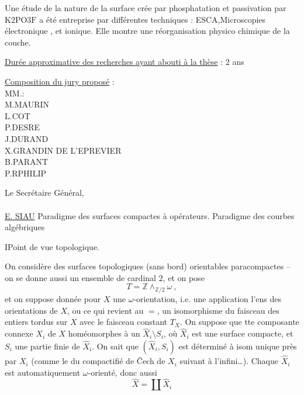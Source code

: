 Une étude de la nature de la surface crée par phosphatation et passivation par $\mathrm{K2PO3F}$ a été entreprise par différentes techniques : ESCA,Microscopies électronique , et ionique. Elle montre une réorganisation physico chimique de la couche.

\uline{Durée approximative des recherches ayant abouti à la thèse} : 2 ans

\uline{Composition du jury proposé} :\\
MM.\qquad :\\
M.\quad MAURIN\\
L.\quad COT\\
P.\quad DESRE\\
J.\quad DURAND\\
X.\quad GRANDIN DE L'EPREVIER\\
B.\quad PARANT\\
P.R\quad PHILIP

Le Secrétaire Général,\\
\\
\uline{E. SIAU}
Paradigme  des surfaces compactes à opérateurs.
Paradigme des courbes algébriques

I\quad Point de vue topologique.

On considère des surfaces topologiques (sans bord) orientables paracompactes  -- on se donne aussi un ensemble \inserted{$\omega$} de cardinal $2$, et on pose
\[
T=\mathbb Z\mathbin{\wedge}_{\mathbb Z/2}\omega\ ,
\]
et on suppose donnée pour $X$ une $\omega$-orientation, i.e. une application  l'ens des orientations de $X$, ou ce qui revient au $=$, un isomorphisme du faisceau des entiers tordus sur $X$ avec le faisceau constant $T_X$. On suppose que tte composante connexe $X_i$ de $X$  homéomorphes à un $\hat X_i\setminus S_i$, où $\hat X_i$ est une surface compacte, et $S_i$ une partie finie de $\hat X_i$. On sait que $(\hat X_i,S_i)$ est déterminé à isom unique près par $X_i$ (comme le  du compactifié de Čech
de $X_i$ suivant  à l'infini\ldots). Chaque $\hat X_i$ est automatiquement $\omega$-orienté, donc aussi
\[
\hat X=\coprod\hat X_i
\]

